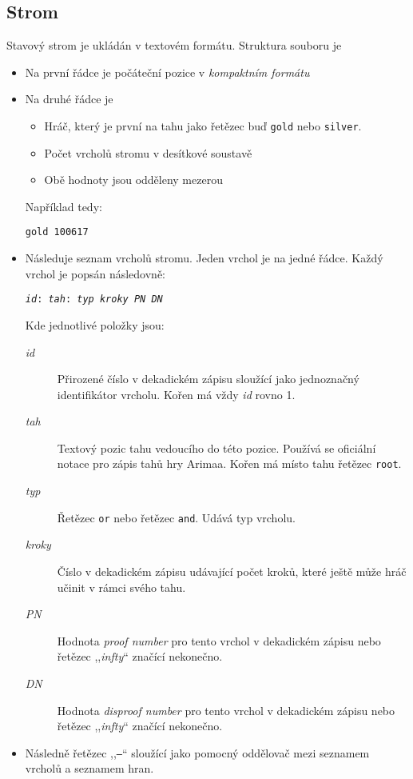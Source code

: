 \documentclass{article}
\begin{document}
\subsection{Strom}
Stavový strom je ukládán v textovém formátu. Struktura souboru je \begin{itemize}
  \item Na první řádce je počáteční pozice v \emph{kompaktním formátu}
  \item Na druhé řádce je \begin{itemize}
    \item Hráč, který je první na tahu jako řetězec buď \texttt{gold} nebo \texttt{silver}.
    \item Počet vrcholů stromu v desítkové soustavě
    \item Obě hodnoty jsou odděleny mezerou
  \end{itemize}
  Například tedy: \begin{center}\verb+gold 100617+\end{center}
  \item Následuje seznam vrcholů stromu. Jeden vrchol je na jedné řádce. Každý vrchol je popsán
  následovně: \begin{center}\texttt{\textit{id}: \textit{tah}: \textit{typ} \textit{kroky} \textit{PN}
  \textit{DN}}\end{center}
  Kde jednotlivé položky jsou:\begin{description}
  \item[\textit{id}] Přirozené číslo v dekadickém zápisu sloužící jako jednoznačný identifikátor vrcholu. Kořen má vždy
  \textit{id} rovno 1.
  \item[\textit{tah}] Textový pozic tahu vedoucího do této pozice. Používá se oficiální notace pro zápis tahů hry
  Arimaa. Kořen má místo tahu řetězec \texttt{root}.
  \item[\textit{typ}] Řetězec \texttt{or} nebo řetězec \texttt{and}. Udává typ vrcholu.
  \item[\textit{kroky}] Číslo v dekadickém zápisu udávající počet kroků, které ještě může hráč učinit v rámci svého
  tahu.
  \item[\textit{PN}] Hodnota \emph{proof number} pro tento vrchol v dekadickém zápisu nebo řetězec ,,\textit{infty}``
  značící nekonečno.
  \item[\textit{DN}] Hodnota \emph{disproof number} pro tento vrchol v dekadickém zápisu nebo řetězec ,,\textit{infty}``
  značící nekonečno.
  \end{description}
  \item Následně řetězec ,,\texttt{---}`` sloužící jako pomocný oddělovač mezi seznamem vrcholů a seznamem hran.

\end{itemize}
\end{document}
